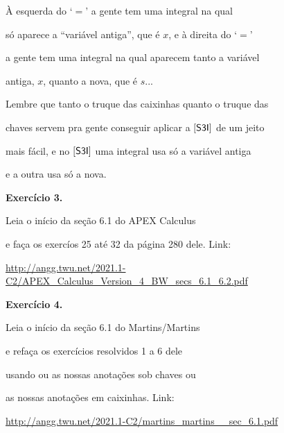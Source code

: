 \documentclass[oneside,12pt]{article}
\begin{document}
À esquerda do `$=$' a gente tem uma integral na qual

só aparece a ``variável antiga'', que é $x$, e à direita do `$=$'

a gente tem uma integral na qual aparecem tanto a variável

antiga, $x$, quanto a nova, que é $s$... \quad \frown

\msk

Lembre que tanto o truque das caixinhas quanto o truque das

chaves servem pra gente conseguir aplicar a $\mathsf{[S3I]}$ de um jeito

mais fácil, e no $\mathsf{[S3I]}$ uma integral usa só a variável antiga

e a outra usa só a nova.








\newpage


{\bf Exercício 3.}

Leia o início da seção 6.1 do APEX Calculus

e faça os exercíos 25 até 32 da página 280 dele. Link:

\ssk

{\scriptsize

\url{http://angg.twu.net/2021.1-C2/APEX_Calculus_Version_4_BW_secs_6.1_6.2.pdf}

}

\bsk
\bsk


{\bf Exercício 4.}

Leia o início da seção 6.1 do Martins/Martins

e refaça os exercícios resolvidos 1 a 6 dele

usando ou as nossas anotações sob chaves ou

as nossas anotações em caixinhas. Link:

\ssk

{\scriptsize

\url{http://angg.twu.net/2021.1-C2/martins_martins__sec_6.1.pdf}

}
\end{document}
